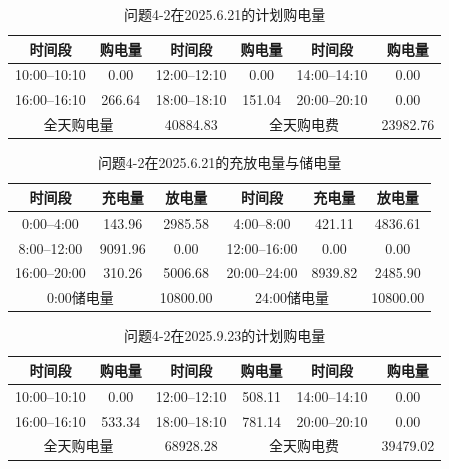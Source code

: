 \documentclass[UTF8]{ctexart}
\begin{document}
    \begin{table}[htbp]
        \centering
        \caption{问题4-2在2025.6.21的计划购电量}
        \label{tab:q42_tenminute_0621}
        \begin{tabular}{cccccc}
            \toprule
            时间段 & 购电量 & 时间段 & 购电量 & 时间段 & 购电量 \\
            \midrule
            10:00--10:10 & 0.00 & 12:00--12:10 & 0.00 & 14:00--14:10 & 0.00 \\
            16:00--16:10 & 266.64 & 18:00--18:10 & 151.04 & 20:00--20:10 & 0.00 \\
            \midrule
            \multicolumn{2}{c}{全天购电量} & 40884.83 &
            \multicolumn{2}{c}{全天购电费} & 23982.76 \\
            \bottomrule
        \end{tabular}
    \end{table}
    
    \begin{table}[htbp]
        \centering
        \caption{问题4-2在2025.6.21的充放电量与储电量}
        \label{tab:q42_battery_0621}
        \begin{tabular}{cccccc}
            \toprule
            时间段 & 充电量 & 放电量 & 时间段 & 充电量 & 放电量 \\
            \midrule
            0:00--4:00 & 143.96 & 2985.58 & 4:00--8:00 & 421.11 & 4836.61 \\
            8:00--12:00 & 9091.96 & 0.00 & 12:00--16:00 & 0.00 & 0.00 \\
            16:00--20:00 & 310.26 & 5006.68 & 20:00--24:00 & 8939.82 & 2485.90 \\
            \midrule
            \multicolumn{2}{c}{0:00储电量} & 10800.00 &
            \multicolumn{2}{c}{24:00储电量} & 10800.00 \\
            \bottomrule
        \end{tabular}
    \end{table}
    
    \begin{table}[htbp]
        \centering
        \caption{问题4-2在2025.9.23的计划购电量}
        \label{tab:q42_tenminute_0923}
        \begin{tabular}{cccccc}
            \toprule
            时间段 & 购电量 & 时间段 & 购电量 & 时间段 & 购电量 \\
            \midrule
            10:00--10:10 & 0.00 & 12:00--12:10 & 508.11 & 14:00--14:10 & 0.00 \\
            16:00--16:10 & 533.34 & 18:00--18:10 & 781.14 & 20:00--20:10 & 0.00 \\
            \midrule
            \multicolumn{2}{c}{全天购电量} & 68928.28 &
            \multicolumn{2}{c}{全天购电费} & 39479.02 \\
            \bottomrule
        \end{tabular}
    \end{table}
    
\end{document}
